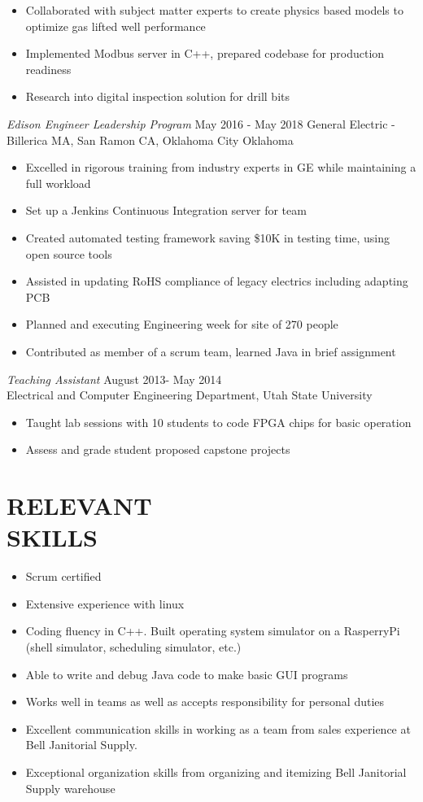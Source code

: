 \documentclass[line,margin]{res}
\begin{document}
\begin{resume}
\begin{itemize}
		\item Collaborated with subject matter experts to create physics based models to optimize gas lifted well performance
		\item Implemented Modbus server in C++, prepared codebase for production readiness
		\item Research into digital inspection solution for drill bits
	\end{itemize}
	{\sl Edison Engineer Leadership Program} \hfill May 2016 - May 2018
	General Electric - Billerica MA, San Ramon CA, Oklahoma City Oklahoma
	\begin{itemize} \itemsep -2pt
		\item Excelled in rigorous training from industry experts in GE while maintaining a full workload
		\item Set up a Jenkins Continuous Integration server for team
		\item Created automated testing framework saving \$10K in testing time, using open source tools
		\item Assisted in updating RoHS compliance of legacy electrics including adapting PCB
		\item Planned and executing Engineering week for site of 270 people
		\item Contributed as member of a scrum team, learned Java in brief assignment
	\end{itemize}
	{\sl Teaching Assistant} \hfill August 2013- May 2014 \\
	Electrical and Computer Engineering Department, Utah State University
	\begin{itemize}  \itemsep -2pt %
		\item Taught lab sessions with 10 students to code FPGA chips for
		      basic operation
		\item Assess and grade student proposed capstone projects
	\end{itemize}

	\section{RELEVANT\\SKILLS}
	\begin{itemize}
		\item Scrum certified
		\item Extensive experience with linux
		\item Coding fluency in C++. Built operating system simulator on
		      a RasperryPi (shell simulator, scheduling simulator, etc.)
		\item Able to write and debug Java code to make basic GUI programs
		\item Works well in teams as well as accepts responsibility for personal duties
		\item Excellent communication skills in working as a team from sales experience
		      at Bell Janitorial Supply.
		\item Exceptional organization skills from organizing and itemizing Bell 								Janitorial Supply warehouse
	\end{itemize}


\end{resume}
\end{document}
